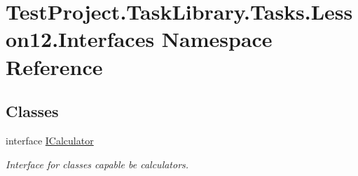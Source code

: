 \hypertarget{namespace_test_project_1_1_task_library_1_1_tasks_1_1_lesson12_1_1_interfaces}{}\section{Test\+Project.\+Task\+Library.\+Tasks.\+Lesson12.\+Interfaces Namespace Reference}
\label{namespace_test_project_1_1_task_library_1_1_tasks_1_1_lesson12_1_1_interfaces}
\subsection*{Classes}
\begin{DoxyCompactItemize}
\item 
interface \mbox{\hyperlink{interface_test_project_1_1_task_library_1_1_tasks_1_1_lesson12_1_1_interfaces_1_1_i_calculator}{I\+Calculator}}
\begin{DoxyCompactList}\small\item\em Interface for classes capable be calculators. \end{DoxyCompactList}\end{DoxyCompactItemize}
